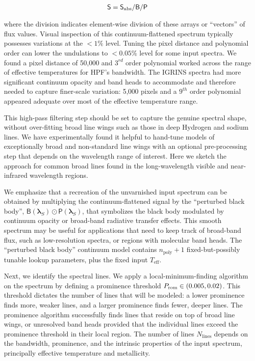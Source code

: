 \documentclass[modern]{aastex631}
\begin{document}
\begin{eqnarray}
    \mathsf{S} = \mathsf{S}_{\rm abs}/\mathsf{B} / \mathsf{P}
    \label{eqnFlattening}
\end{eqnarray}


where the division indicates element-wise division of these arrays or ``vectors'' of flux values.  Visual inspection of this continuum-flattened spectrum typically possesses variations at the $<1\%$ level. Tuning the pixel distance and polynomial order can lower the undulations to $<0.05\%$ level for some input spectra. We found a pixel distance of 50,000 and $3^{rd}$ order polynomial worked across the range of effective temperatures for HPF's bandwidth. The IGRINS spectra had more significant continuum opacity and band heads to accommodate and therefore needed to capture finer-scale variation: 5,000 pixels and a $9^{th}$ order polynomial appeared adequate over most of the effective temperature range.

This high-pass filtering step should be set to capture the genuine spectral shape, without over-fitting broad line wings such as those in deep Hydrogen and sodium lines. We have experimentally found it helpful to hand-tune models of exceptionally broad and non-standard line wings with an optional pre-processing step that depends on the wavelength range of interest. Here we sketch the approach for common broad lines found in the long-wavelength visible and near-infrared wavelength regions.


We emphasize that a recreation of the unvarnished input spectrum can be obtained by multiplying the continuum-flattened signal by the ``perturbed black body'', $\mathsf{B}(\bm{\lambda}_S)\odot \mathsf{P}(\bm{\lambda}_S)$, that symbolizes the black body modulated by continuum opacity or broad-band radiative transfer effects. This smooth spectrum may be useful for applications that need to keep track of broad-band flux, such as low-resolution spectra, or regions with molecular band heads. The ``perturbed black body'' continuum model contains $n_{\mathrm{poly}}+1$ fixed-but-possibly tunable lookup parameters, plus the fixed input $T_{\mathrm{eff}}$.

Next, we identify the spectral lines. We apply a local-minimum-finding algorithm on the spectrum by defining a prominence threshold $P_{\rm rom} \in (0.005, 0.02)$. This threshold dictates the number of lines that will be modeled: a lower prominence finds more, weaker lines, and a larger prominence finds fewer, deeper lines. The prominence algorithm successfully finds lines that reside on top of broad line wings, or unresolved band heads provided that the individual lines exceed the prominence threshold in their local region. The number of lines $N_{\mathrm{lines}}$ depends on the bandwidth, prominence, and the intrinsic properties of the input spectrum, principally effective temperature and metallicity.
\end{document}
